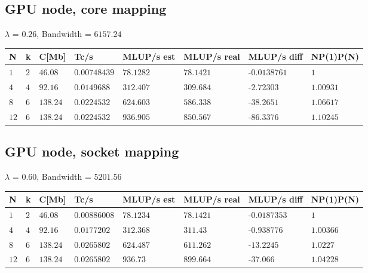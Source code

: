 \documentclass[11pt,a4paper]{article}
\begin{document}
\subsection*{GPU node, core mapping}
$\lambda$ = $0.26$, Bandwidth = $6157.24$
\begin{table}[H]
    \centering
    \begin{tabular}{|l|l|l|l|l|l|l|l|}
    \toprule
    N 		& k 	& C[Mb] 	& Tc/s 			& MLUP/s est 	& MLUP/s real 	& MLUP/s diff  & NP(1)P(N) \\
    \midrule
    $1$ 	& $2$ 	& $46.08$ 	& $0.00748439$ 	& $78.1282$ 	& $78.1421$ 	&-$0.0138761$ & $1$ \\
    $4$ 	& $4$ 	& $92.16$ 	& $0.0149688$ 	& $312.407$ 	& $309.684$ 	&-$2.72303$ & $1.00931$ \\
    $8$ 	& $6$ 	& $138.24$ 	& $0.0224532$ 	& $624.603$ 	& $586.338$ 	&-$38.2651$ & $1.06617$ \\
    $12$ 	& $6$ 	& $138.24$ 	& $0.0224532$ 	& $936.905$ 	& $850.567$ 	&-$86.3376$ & $1.10245$ \\
    \bottomrule
    \end{tabular}
\end{table}
\subsection*{GPU node, socket mapping}
$\lambda$ = $0.60$, Bandwidth = $5201.56$
\begin{table}[H]
    \centering
    \begin{tabular}{|l|l|l|l|l|l|l|l|}
    \toprule
    N 		& k 	& C[Mb] 	& Tc/s 			& MLUP/s est 	& MLUP/s real 	& MLUP/s diff  & NP(1)P(N) \\
    \midrule
    $1$ 	& $2$ 	& $46.08$ 	& $0.00886008$ 	& $78.1234$ 	& $78.1421$ 	&-$0.0187353$ & $1$ \\
    $4$ 	& $4$ 	& $92.16$ 	& $0.0177202$ 	& $312.368$ 	& $311.43$ 		&-$0.938776$ & $1.00366$ \\
    $8$ 	& $6$ 	& $138.24$ 	& $0.0265802$ 	& $624.487$ 	& $611.262$ 	&-$13.2245$ & $1.0227$ \\
    $12$ 	& $6$ 	& $138.24$ 	& $0.0265802$ 	& $936.73$ 		& $899.664$ 	&-$37.066$ & $1.04228$ \\
    \bottomrule
    \end{tabular}
\end{table}
\end{document}
